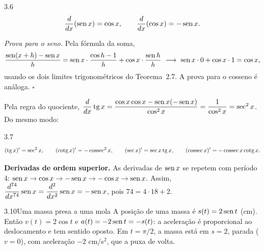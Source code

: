 \begin{teorema}{3.6}
\[
\frac{d}{dx}(\operatorname{sen} x)=\cos x,\qquad \frac{d}{dx}(\cos x)=-\operatorname{sen} x .
\]
\end{teorema}
\emph{Prova para o seno.} Pela fórmula da soma,
\[
\frac{\operatorname{sen}(x+h)-\operatorname{sen} x}{h}=\operatorname{sen} x\cdot\frac{\cos h-1}{h}+\cos x\cdot\frac{\operatorname{sen} h}{h}
\ \longrightarrow\ \operatorname{sen} x\cdot0+\cos x\cdot1=\cos x,
\]
usando os dois limites trigonométricos do Teorema~2.7. A prova para o cosseno é
análoga. $\square$


Pela regra do quociente, $\dfrac{d}{dx}\operatorname{tg} x=\dfrac{\cos x\cos x-\operatorname{sen} x(-\operatorname{sen} x)}{\cos^2x}
=\dfrac1{\cos^2x}=\sec^2x$. Do mesmo modo:

\begin{teorema}{3.7}
\[
(\operatorname{tg} x)'=\sec^2x,\qquad (\operatorname{cotg} x)'=-\operatorname{cossec}^2x,\qquad (\sec x)'=\sec x\operatorname{tg} x,\qquad
(\operatorname{cossec} x)'=-\operatorname{cossec} x\operatorname{cotg} x .
\]
\end{teorema}

\textbf{Derivadas de ordem superior.} As derivadas de $\operatorname{sen} x$ se repetem com período 4:
$\operatorname{sen} x\to\cos x\to-\operatorname{sen} x\to-\cos x\to\operatorname{sen} x$. Assim,
$\dfrac{d^{74}}{dx^{74}}\operatorname{sen} x=\dfrac{d^2}{dx^2}\operatorname{sen} x=-\operatorname{sen} x$, pois $74=4\cdot18+2$.

\begin{exemplo}{3.10}{Uma massa presa a uma mola}
A posição de uma massa é $s(t)=2\operatorname{sen} t$ (cm). Então $v(t)=2\cos t$ e $a(t)=-2\operatorname{sen} t=-s(t)$:
a aceleração é proporcional ao deslocamento e tem sentido oposto. Em $t=\pi/2$, a massa está
em $s=2$, parada ($v=0$), com aceleração $-2$ cm/s$^2$, que a puxa de volta.
\end{exemplo}

